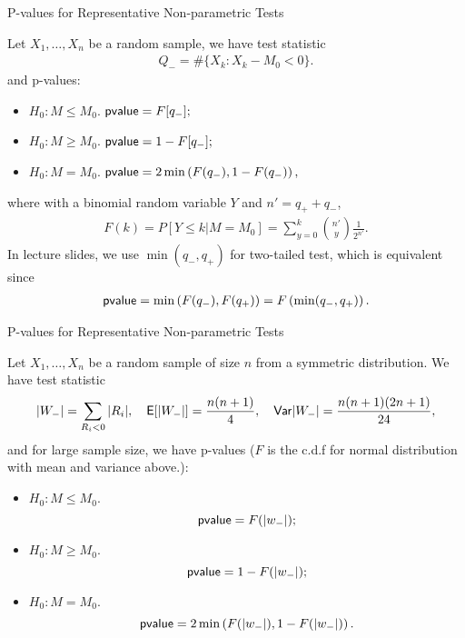 \begin{frame}{P-values for Representative Non-parametric Tests}

\justifying
{} Let $X_1, \ldots, X_n$ be a random sample, we have test statistic
\begin{align*}
Q_- = \#\{X_k: X_k - M_0 < 0 \}.
\end{align*}
and p-values:
\begin{itemize}
	\item \underline{$H_0: M \leq M_0$}. $\mathsf{pvalue} = F[q_-];$
	\item \underline{$H_0: M \geq M_0$}. $\mathsf{pvalue} = 1 - F[q_-];$
	\item \underline{$H_0: M = M_0$}. $\mathsf{pvalue} = 2\min \left(F(q_-), 1 - F(q_-)\right),$
\end{itemize}
where with a binomial random variable $Y$ and $n' = q_+ + q_-$,
\begin{align*}
F(k) = P[Y\leq k|M=M_0] = \sum_{y=0}^k\binom{n'}{y}\frac{1}{2^{n'}}.
\end{align*}
 In lecture slides, we use $\min(q_-, q_+)$ for two-tailed test, which is equivalent since
\begin{align*}
\mathsf{pvalue} = \min\left(F(q_-), F(q_+) \right) = F\left(\min(q_-, q_+) \right).
\end{align*}


\end{frame}


\begin{frame}{P-values for Representative Non-parametric Tests}

\justifying
{} Let $X_1, \ldots, X_n$ be a random sample of size $n$ from a symmetric distribution. We have test statistic
\footnotesize
\begin{align*}
|W_-| = \sum_{R_i < 0} |R_i|, \quad \mathsf{E}[|W_-|] = \frac{n(n+1)}{4}, \quad \mathsf{Var}|W_-| = \frac{n(n+1)(2n+1)}{24},
\end{align*}
\normalsize
and for large sample size, we have p-values ($F$ is the c.d.f for normal distribution with mean and variance above.):
\begin{itemize}
	\item \underline{$H_0: M \leq M_0$}. $$\mathsf{pvalue} = F(|w_-|);$$
	\item \underline{$H_0: M \geq M_0$}. $$\mathsf{pvalue} = 1 - F(|w_-|);$$
	\item \underline{$H_0: M = M_0$}. $$\mathsf{pvalue} = 2\min \left(F(|w_-|), 1 - F(|w_-|)\right).$$
\end{itemize}



\end{frame}


